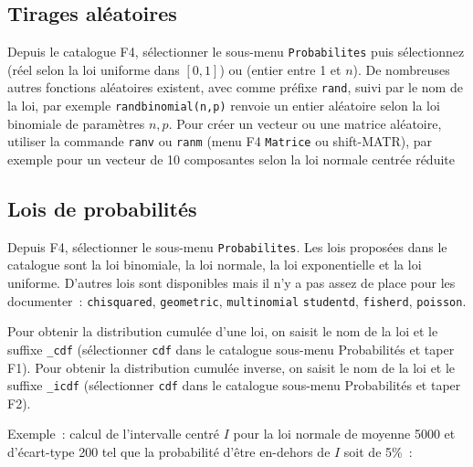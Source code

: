 \documentclass{article}
\begin{document}
\begin{giacjshere}
\subsection{Tirages al\'eatoires}
Depuis le catalogue F4, s\'electionner le sous-menu \verb|Probabilites|
puis s\'electionnez  (r\'eel selon
la loi uniforme dans $[0,1]$) ou 
(entier
entre 1 et $n$). De nombreuses autres fonctions al\'eatoires
existent, avec comme pr\'efixe \verb|rand|, suivi par le nom
de la loi, par exemple \verb|randbinomial(n,p)| renvoie
un entier al\'eatoire selon la loi binomiale de param\`etres $n,p$.
Pour cr\'eer un vecteur ou une matrice al\'eatoire, utiliser la commande
\verb|ranv| ou \verb|ranm| (menu F4 \verb|Matrice| ou shift-MATR), 
par exemple pour un vecteur de 10 composantes
selon la loi normale centr\'ee r\'eduite 

\subsection{Lois de probabilit\'es}
Depuis F4, s\'electionner le sous-menu \verb|Probabilites|.
Les lois propos\'ees dans le catalogue sont la loi binomiale, la loi normale,
la loi exponentielle et la loi uniforme. 
D'autres lois sont disponibles mais il n'y a pas assez de place pour
les documenter~:
\verb|chisquared|, \verb|geometric|, \verb|multinomial|
\verb|studentd|, \verb|fisherd|, \verb|poisson|.

Pour obtenir la distribution cumul\'ee d'une loi, on saisit le nom de la loi
et le suffixe \verb|_cdf| (s\'electionner \verb|cdf| dans le catalogue
sous-menu Probabilit\'es et taper F1). 
Pour obtenir la distribution cumul\'ee inverse,
on saisit le nom de la loi et le suffixe \verb|_icdf|  
(s\'electionner \verb|cdf| dans le catalogue
sous-menu Probabilit\'es et taper F2).

Exemple~: calcul de l'intervalle centr\'e $I$
pour la loi normale de moyenne 5000 et d'\'ecart-type 200
tel que la probabilit\'e d'\^etre en-dehors de $I$ soit de 5\%~:


\end{giacjshere}
\end{document}
